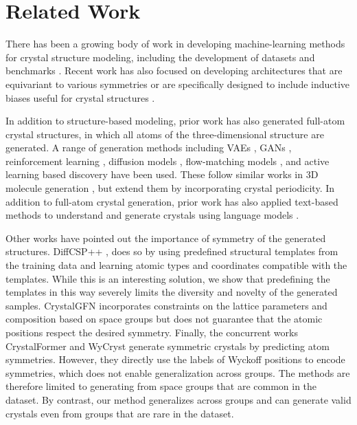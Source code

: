 \section{Related Work}
There has been a growing body of work in developing machine-learning methods for crystal structure modeling, including the development of datasets and benchmarks \citep{jain2013commentary,saal2013materials,chanussot2021open, miret2023the, lee2023matsciml,choudhary2024jarvis}. Recent work has also focused on developing
architectures that are equivariant to various symmetries \citet{duval2023hitchhiker} or are specifically designed to include inductive biases useful for crystal structures \citep{xie2018crystal,kaba2022equivariant, goodall2022,yan2022periodic,yan2024space}.

In addition to structure-based modeling, prior work has also generated full-atom crystal structures, in which all atoms of the three-dimensional structure are generated.
A range of generation methods including VAEs \citep{noh2019inverse,xie2022crystal}, GANs \citep{nouira2018crystalgan,kim2020generative}, reinforcement learning \citep{govindarajan2023learning}, diffusion models \citep{zeni2023mattergen, yang2023scalable,jiao2023crystal,klipfel2024vector}, flow-matching models \citep{millerflowmm}, and active learning based discovery \citep{merchant2023scaling} have been used.
 These follow similar works in 3D molecule generation \citep{hoogeboom2022equivariant, garcia2021n,  xu2022geodiff}, but extend them by incorporating crystal periodicity.
In addition to full-atom crystal generation, prior work has also applied text-based methods to understand and generate crystals using language models \citep{flam2023language,gruverfine, alampara2024mattext}.

Other works have pointed out the importance of symmetry of the generated structures. DiffCSP++ \citep{jiao2024space}, does so by using predefined structural templates from the training data and learning atomic types and coordinates compatible with the templates. While this is an interesting solution, we show that predefining the templates in this way severely limits the diversity and novelty of the generated samples. CrystalGFN \citep{ai4science2023crystal} incorporates constraints on the lattice parameters and composition based on space groups but does not guarantee that the atomic positions respect the desired symmetry. Finally, the concurrent works CrystalFormer \citep{cao2024space} and WyCryst 
\citep{zhu2024wycryst}  generate symmetric crystals by predicting atom symmetries. However, they directly use the labels of Wyckoff positions to encode symmetries, which does not enable generalization across groups. The methods are therefore limited to generating from space groups that are common in the dataset. By contrast, our method generalizes across groups and can generate valid crystals even from groups that are rare in the dataset.